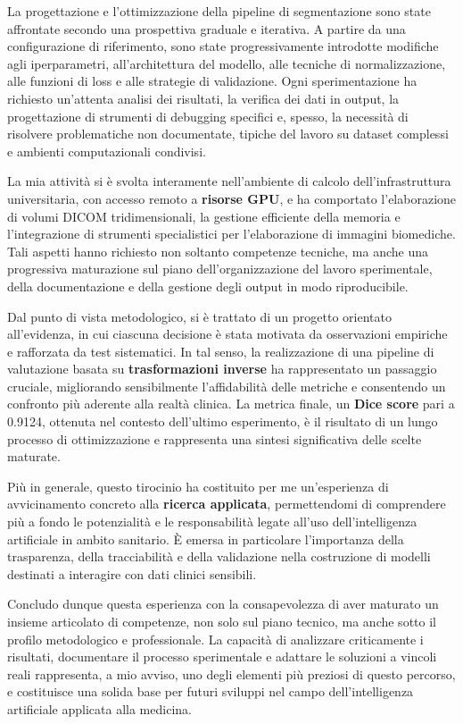 La progettazione e l’ottimizzazione della pipeline di segmentazione sono state affrontate secondo una prospettiva graduale e iterativa. A partire da una configurazione di riferimento, sono state progressivamente introdotte modifiche agli iperparametri, all’architettura del modello, alle tecniche di normalizzazione, alle funzioni di loss e alle strategie di validazione. Ogni sperimentazione ha richiesto un’attenta analisi dei risultati, la verifica dei dati in output, la progettazione di strumenti di debugging specifici e, spesso, la necessità di risolvere problematiche non documentate, tipiche del lavoro su dataset complessi e ambienti computazionali condivisi.

La mia attività si è svolta interamente nell’ambiente di calcolo dell’infrastruttura universitaria, con accesso remoto a \textbf{risorse GPU}, e ha comportato l’elaborazione di volumi DICOM tridimensionali, la gestione efficiente della memoria e l’integrazione di strumenti specialistici per l’elaborazione di immagini biomediche. Tali aspetti hanno richiesto non soltanto competenze tecniche, ma anche una progressiva maturazione sul piano dell’organizzazione del lavoro sperimentale, della documentazione e della gestione degli output in modo riproducibile.

Dal punto di vista metodologico, si è trattato di un progetto orientato all’evidenza, in cui ciascuna decisione è stata motivata da osservazioni empiriche e rafforzata da test sistematici. In tal senso, la realizzazione di una pipeline di valutazione basata su \textbf{trasformazioni inverse} ha rappresentato un passaggio cruciale, migliorando sensibilmente l’affidabilità delle metriche e consentendo un confronto più aderente alla realtà clinica. La metrica finale, un \textbf{Dice score} pari a 0.9124, ottenuta nel contesto dell’ultimo esperimento, è il risultato di un lungo processo di ottimizzazione e rappresenta una sintesi significativa delle scelte maturate.

Più in generale, questo tirocinio ha costituito per me un’esperienza di avvicinamento concreto alla \textbf{ricerca applicata}, permettendomi di comprendere più a fondo le potenzialità e le responsabilità legate all’uso dell’intelligenza artificiale in ambito sanitario. È emersa in particolare l’importanza della trasparenza, della tracciabilità e della validazione nella costruzione di modelli destinati a interagire con dati clinici sensibili.

Concludo dunque questa esperienza con la consapevolezza di aver maturato un insieme articolato di competenze, non solo sul piano tecnico, ma anche sotto il profilo metodologico e professionale. La capacità di analizzare criticamente i risultati, documentare il processo sperimentale e adattare le soluzioni a vincoli reali rappresenta, a mio avviso, uno degli elementi più preziosi di questo percorso, e costituisce una solida base per futuri sviluppi nel campo dell’intelligenza artificiale applicata alla medicina.

